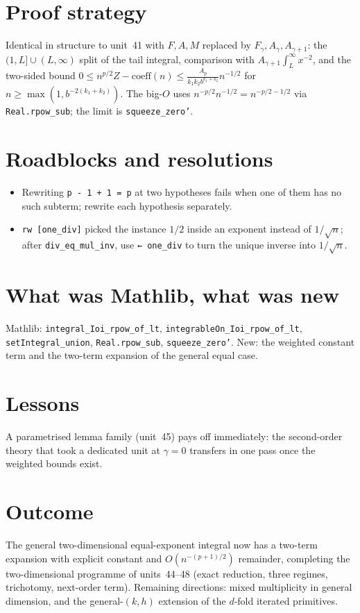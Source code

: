 \documentclass[11pt]{article}
\begin{document}
\section{Proof strategy}
Identical in structure to unit~41 with $F,A,M$ replaced by $F_\gamma,A_\gamma,A_{\gamma+1}$: the
$(1,L]\cup(L,\infty)$ split of the tail integral, comparison with $A_{\gamma+1}\int_L^\infty x^{-2}$,
and the two-sided bound $0\le n^{p/2}Z-\mathrm{coeff}(n)\le\tfrac{A_p}{k_1k_2b^{k_1+k_2}}n^{-1/2}$ for
$n\ge\max(1,b^{-2(k_1+k_2)})$. The big-$O$ uses $n^{-p/2}n^{-1/2}=n^{-p/2-1/2}$ via
\texttt{Real.rpow\_sub}; the limit is \texttt{squeeze\_zero'}.

\section{Roadblocks and resolutions}
\begin{itemize}
\item Rewriting \texttt{p - 1 + 1 = p} at two hypotheses fails when one of them has no such
subterm; rewrite each hypothesis separately.
\item \texttt{rw [one\_div]} picked the instance $1/2$ inside an exponent instead of $1/\sqrt n$;
after \texttt{div\_eq\_mul\_inv}, use \texttt{← one\_div} to turn the unique inverse into $1/\sqrt n$.
\end{itemize}

\section{What was Mathlib, what was new}
Mathlib: \texttt{integral\_Ioi\_rpow\_of\_lt}, \texttt{integrableOn\_Ioi\_rpow\_of\_lt},
\texttt{setIntegral\_union}, \texttt{Real.rpow\_sub}, \texttt{squeeze\_zero'}. New: the weighted constant
term and the two-term expansion of the general equal case.

\section{Lessons}
A parametrised lemma family (unit~45) pays off immediately: the second-order theory that took a
dedicated unit at $\gamma=0$ transfers in one pass once the weighted bounds exist.

\section{Outcome}
The general two-dimensional equal-exponent integral now has a two-term expansion with explicit
constant and $O(n^{-(p+1)/2})$ remainder, completing the two-dimensional programme of units~44--48
(exact reduction, three regimes, trichotomy, next-order term). Remaining directions: mixed multiplicity
in general dimension, and the general-$(k,h)$ extension of the $d$-fold iterated primitives.
\end{document}
